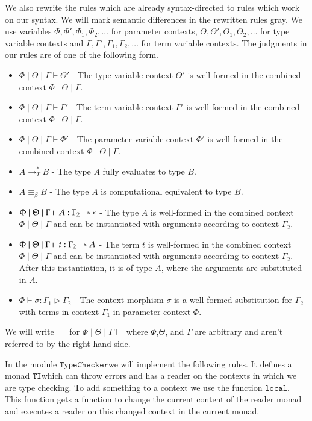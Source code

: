 \documentclass[a4paper,cleardoubleempty,BCOR1cm]{scrbook}
\begin{document}
We also rewrite the rules which are already syntax-directed to rules which
work on our syntax.   We will mark semantic differences in the rewritten rules
gray. We use variables \(\Phi,\Phi',\Phi_1,\Phi_2,\dots\) for parameter contexts,
\(\Theta,\Theta',\Theta_1,\Theta_2,\dots\) for type variable contexts and
\(\Gamma,\Gamma',\Gamma_1,\Gamma_2,\dots\) for term variable contexts.
The judgments in our rules are of one of the following form.
\begin{itemize}
\item \(\Phi\mid\Theta\mid\Gamma\vdash\Theta'\) - The type variable context
\(\Theta'\) is well-formed in the combined context \(\Phi\mid\Theta\mid\Gamma\).
\item \(\Phi\mid\Theta\mid\Gamma\vdash\Gamma'\) - The term variable context
\(\Gamma'\) is well-formed in the combined context \(\Phi\mid\Theta\mid\Gamma\).
\item \(\Phi\mid\Theta\mid\Gamma\vdash\Phi'\) - The parameter variable context
\(\Phi'\) is well-formed in the combined context \(\Phi\mid\Theta\mid\Gamma\).
\item \(A\longrightarrow_T^* B\) - The type \(A\) fully evaluates to type \(B\).
\item \(A \equiv_\beta B\) - The type \(A\) is computational equivalent to type \(B\).
\item \(\Phi\mid\Theta\mid\Gamma\vdash A : \Gamma_2\rightarrowtriangle*\) - The type
\(A\) is well-formed in the combined context \(\Phi\mid\Theta\mid\Gamma\) and
can be instantiated with arguments according to context \(\Gamma_2\).
\item \(\Phi\mid\Theta\mid\Gamma\vdash t : \Gamma_2\rightarrowtriangle A\) - The term \(t\) is
well-formed in the combined context \(\Phi\mid\Theta\mid\Gamma\) and can be
instantiated with arguments according to context \(\Gamma_2\).  After this
instantiation, it is of type \(A\), where the arguments are substituted in \(A\).
\item \(\Phi \vdash \sigma : \Gamma_1 \triangleright \Gamma_2\) - The context
morphism \(\sigma\) is a well-formed substitution for \(\Gamma_2\) with terms
in context \(\Gamma_1\) in parameter context \(\Phi\).
\end{itemize}
We will write \(\vdash\) for \(\Phi\mid\Theta\mid\Gamma\vdash\) where
\(\Phi\),\(\Theta\), and \(\Gamma\) are arbitrary and aren't referred to by the
right-hand side.

In the module $\mathtt{TypeChecker}$\;we will implement the following rules.  It
defines a monad $\mathtt{TI}$\;which can throw errors and has a reader on the contexts
in which we are type checking.  To add something to a context we use the
function $\mathtt{local}$.  This function gets a function to change the current
content of the reader monad and executes a reader on this changed context in
the current monad.
\end{document}

